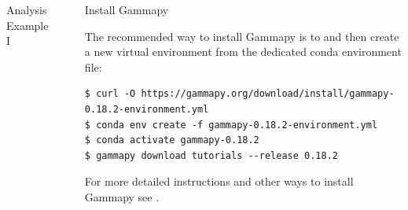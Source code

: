 \documentclass[
    final,
    ]{beamer}
\newlength{\sepwidth}
\newlength{\colwidth}
\newcommand{\separatorcolumn}{\begin{column}{\sepwidth}\end{column}}
\newcommand{\coloredhref}[3][blue]{\href{#2}{\color{#1}{#3}}}%
\begin{document}
\begin{frame}[t, fragile]
\begin{columns}[t]
\begin{column}{\colwidth}
\begin{block}{Analysis Example I}
  \end{block}

\end{column}

\separatorcolumn

\begin{column}{\colwidth}

  \begin{alertblock}{Install Gammapy}

    The recommended way to install Gammapy is to \coloredhref[pink]{https://www.anaconda.com/products/individual}{download the Anaconda Python distribution} and then create a new virtual environment
    from the dedicated conda environment file:
%
    \begin{verbatim}
$ curl -O https://gammapy.org/download/install/gammapy-0.18.2-environment.yml
$ conda env create -f gammapy-0.18.2-environment.yml
$ conda activate gammapy-0.18.2
$ gammapy download tutorials --release 0.18.2
    \end{verbatim}
%
    \vspace{-24pt} 
    For more detailed instructions and other ways to install Gammapy see \coloredhref[pink]{https://docs.gammapy.org/0.18.2/install/index.html}{installation instructions}.
  \end{alertblock}


\end{column}
\end{columns}
\end{frame}
\end{document}
